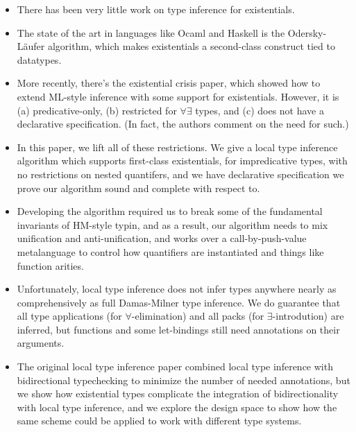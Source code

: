 \begin{itemize}
\item There has been very little work on type inference for existentials. 
\item The state of the art in languages like Ocaml and Haskell is the
  Odersky-L\"{a}ufer algorithm, which makes existentials a
  second-class construct tied to datatypes.
\item More recently, there's the existential crisis paper, which
  showed how to extend ML-style inference with some support for
  existentials. However, it is (a) predicative-only, (b) restricted
  for $\forall\exists$ types, and (c) does not have a declarative
  specification. (In fact, the authors comment on the need for such.)
\item In this paper, we lift all of these restrictions. We give a
  local type inference algorithm which supports first-class
  existentials, for impredicative types, with no restrictions on
  nested quantifers, and we have declarative specification we prove
  our algorithm sound and complete with respect to.
\item Developing the algorithm required us to break some of the
  fundamental invariants of HM-style typin, and as a result, our
  algorithm needs to mix unification and anti-unification, and works
  over a call-by-push-value metalanguage to control how quantifiers
  are instantiated and things like function arities.
\item Unfortunately, local type inference does not infer types anywhere
  nearly as comprehensively as full Damas-Milner type inference. We
  do guarantee that all type applications (for $\forall$-elimination) 
  and all packs (for $\exists$-introdution) are inferred, but functions
  and some let-bindings still need annotations on their arguments.
\item The original local type inference paper combined local type inference
  with bidirectional typechecking to minimize the number of needed
  annotations, but we show how existential types complicate the integration
  of bidirectionality with local type inference, and we explore the design space
  to show how the same scheme could be applied to work with different
  type systems. 
\end{itemize}





